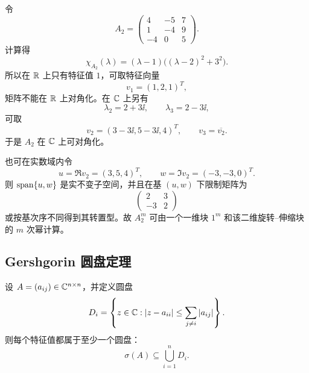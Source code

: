 \begin{example}[实矩阵的复特征值与实分块]
令
\begin{equation}
 A_2=\begin{pmatrix}
 4&-5&7\\
 1&-4&9\\
 -4&0&5
 \end{pmatrix}.
\end{equation}
计算得
\begin{equation}
 \chi_{A_2}(\lambda)
 =(\lambda-1)\bigl((\lambda-2)^2+3^2\bigr).
\end{equation}
所以在 $\mathbb R$ 上只有特征值 $1$，可取特征向量
\begin{equation}
 v_1=(1,2,1)^T,
\end{equation}
矩阵不能在 $\mathbb R$ 上对角化。在 $\mathbb C$ 上另有
\begin{equation}
 \lambda_2=2+3\ii,
 \qquad
 \lambda_3=2-3\ii,
\end{equation}
可取
\begin{equation}
 v_2=(3-3\ii,5-3\ii,4)^T,
 \qquad
 v_3=\overline{v_2}.
\end{equation}
于是 $A_2$ 在 $\mathbb C$ 上可对角化。

也可在实数域内令
\begin{equation}
 u=\Re v_2=(3,5,4)^T,
 \qquad
 w=\Im v_2=(-3,-3,0)^T.
\end{equation}
则 $\operatorname{span}\{u,w\}$ 是实不变子空间，并且在基 $(u,w)$ 下限制矩阵为
\begin{equation}
 \begin{pmatrix}2&3\\-3&2\end{pmatrix}
\end{equation}
或按基次序不同得到其转置型。故 $A_2^m$ 可由一个一维块 $1^m$ 和该二维旋转--伸缩块的 $m$ 次幂计算。
\end{example}

\subsection{Gershgorin 圆盘定理}

\begin{theorem}[Gershgorin]
设 $A=(a_{ij})\in\mathbb C^{n\times n}$，并定义圆盘
\begin{equation}
 D_i=\left\{z\in\mathbb C:
 |z-a_{ii}|\leq\sum_{j\neq i}|a_{ij}|\right\}.
\end{equation}
则每个特征值都属于至少一个圆盘：
\begin{equation}
 \sigma(A)\subseteq\bigcup_{i=1}^nD_i.
\end{equation}
\end{theorem}

